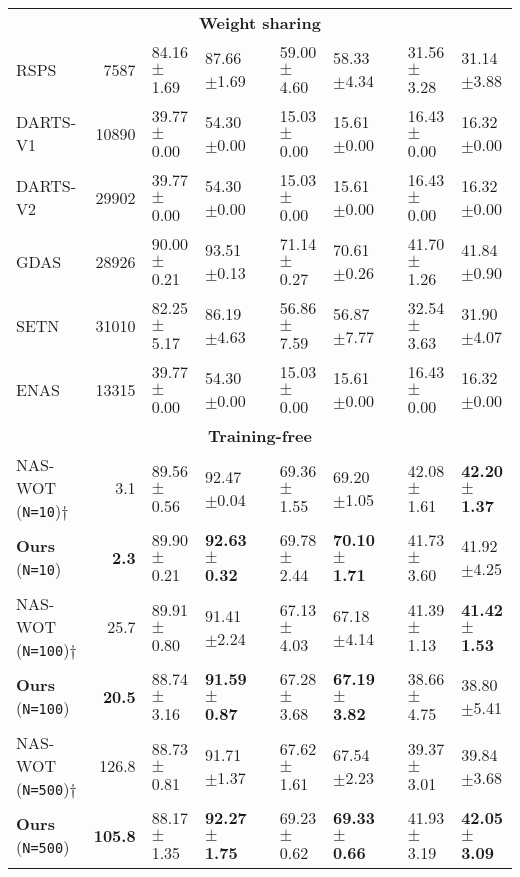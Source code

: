 \documentclass[10pt, conference]{IEEEtran}
\begin{document}
\begin{table*}[htb]
{\begin{tabular}{@{}lr@{\hskip 0.15in}llcllcll@{}}
			\multicolumn{10}{c}{\textbf{Weight sharing}}\\
			RSPS        & 7587  & 84.16$\pm$1.69 & 87.66$\pm$1.69 && 59.00$\pm$4.60 & 58.33$\pm$4.34 && 31.56$\pm$3.28 & 31.14$\pm$3.88 \\
			DARTS-V1    & 10890 & 39.77$\pm$0.00 & 54.30$\pm$0.00 && 15.03$\pm$0.00 & 15.61$\pm$0.00 && 16.43$\pm$0.00 & 16.32$\pm$0.00 \\
			DARTS-V2    & 29902 & 39.77$\pm$0.00 & 54.30$\pm$0.00 && 15.03$\pm$0.00 & 15.61$\pm$0.00 && 16.43$\pm$0.00 & 16.32$\pm$0.00 \\
			GDAS        & 28926 & 90.00$\pm$0.21 & 93.51$\pm$0.13 && 71.14$\pm$0.27 & 70.61$\pm$0.26 && 41.70$\pm$1.26 & 41.84$\pm$0.90 \\
			SETN        & 31010 & 82.25$\pm$5.17 & 86.19$\pm$4.63 && 56.86$\pm$7.59 & 56.87$\pm$7.77 && 32.54$\pm$3.63 & 31.90$\pm$4.07 \\
			ENAS        & 13315 & 39.77$\pm$0.00 & 54.30$\pm$0.00 && 15.03$\pm$0.00 & 15.61$\pm$0.00 && 16.43$\pm$0.00 & 16.32$\pm$0.00 \\
			\midrule
			\midrule
			\multicolumn{10}{c}{\textbf{Training-free}}\\
			NAS-WOT (\texttt{N=10}){$\dagger$}  & 3.1 & 89.56$\pm$0.56 & 92.47$\pm$0.04 && 69.36$\pm$1.55 & 69.20$\pm$1.05 && 42.08$\pm$1.61 & \textbf{42.20}$\pm$\textbf{1.37} \\
			\textbf{Ours} (\texttt{N=10})  & \textbf{2.3}   & 89.90$\pm$0.21 & \textbf{92.63}$\pm$\textbf{0.32}  && 69.78$\pm$2.44  & \textbf{70.10}$\pm$\textbf{1.71} && 41.73$\pm$3.60       & 41.92$\pm$4.25 \\[0.1cm]
			
			NAS-WOT (\texttt{N=100}){$\dagger$} & 25.7 & 89.91$\pm$0.80 & 91.41$\pm$2.24  && 67.13$\pm$4.03 & 67.18$\pm$4.14 && 41.39$\pm$1.13 & \textbf{41.42}$\pm$\textbf{1.53}  \\
			\textbf{Ours} (\texttt{N=100}) & \textbf{20.5}  & 88.74$\pm$3.16 & \textbf{91.59}$\pm$\textbf{0.87}  && 67.28$\pm$3.68 & \textbf{67.19}$\pm$\textbf{3.82}  && 38.66$\pm$4.75       & 38.80$\pm$5.41  \\[0.1cm]
			
			NAS-WOT (\texttt{N=500}){$\dagger$} & 126.8 & 88.73$\pm$0.81 & 91.71$\pm$1.37 && 67.62$\pm$1.61 & 67.54$\pm$2.23 && 39.37$\pm$3.01 & 39.84$\pm$3.68 \\ 
			\textbf{Ours} (\texttt{N=500}) & \textbf{105.8} & 88.17$\pm$1.35 & \textbf{92.27}$\pm$\textbf{1.75} && 69.23$\pm$0.62 & \textbf{69.33}$\pm$\textbf{0.66} && 41.93$\pm$3.19       & \textbf{42.05}$\pm$\textbf{3.09} \\ [0.1cm]
			

\end{tabular}}
\end{table*}
\end{document}
